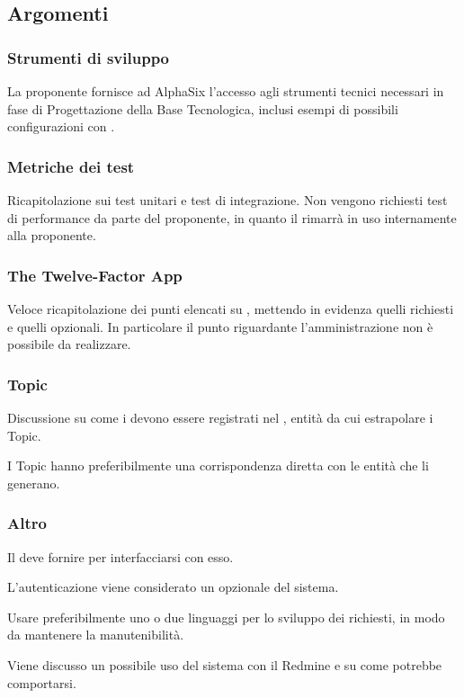         \subsection{Argomenti}
            \subsubsection{Strumenti di sviluppo}
            La proponente fornisce ad AlphaSix l'accesso agli strumenti tecnici necessari in fase di Progettazione della Base Tecnologica, inclusi esempi di possibili configurazioni con .

            \subsubsection{Metriche dei test}
            Ricapitolazione sui test unitari e test di integrazione. Non vengono richiesti test di performance da parte del proponente, in quanto il  rimarrà in uso internamente alla proponente.

            \subsubsection{The Twelve-Factor App}
            Veloce ricapitolazione dei punti elencati su , mettendo in evidenza quelli richiesti e quelli opzionali. In particolare il punto riguardante l'amministrazione non è possibile da realizzare.

            \subsubsection{Topic}
            Discussione su come i  devono essere registrati nel , entità da cui estrapolare i Topic.\par
            I Topic hanno preferibilmente una corrispondenza diretta con le entità che li generano.            

            \subsubsection{Altro}
            Il  deve fornire  per interfacciarsi con esso.\par
            L'autenticazione viene considerato un  opzionale del sistema.\par
            Usare preferibilmente uno o due linguaggi per lo sviluppo dei  richiesti, in modo da mantenere la manutenibilità.\par
            Viene discusso un possibile uso del sistema con il  Redmine e su come potrebbe comportarsi.


